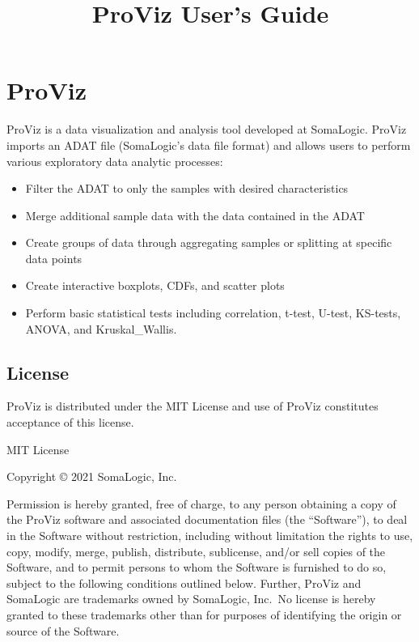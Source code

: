 \documentclass[
]{book}
\title{ProViz User's Guide}
\author{}
\date{\vspace{-2.5em}}
\providecommand{\tightlist}{%
  \setlength{\itemsep}{0pt}\setlength{\parskip}{0pt}}
\begin{document}
\maketitle

{
\setcounter{tocdepth}{1}
\tableofcontents
}
\hypertarget{proviz}{%
\chapter*{ProViz}\label{proviz}}

ProViz is a data visualization and analysis tool developed at SomaLogic. ProViz imports an ADAT file (SomaLogic's data file format) and allows users to perform various exploratory data analytic processes:

\begin{itemize}
\tightlist
\item
  Filter the ADAT to only the samples with desired characteristics
\item
  Merge additional sample data with the data contained in the ADAT
\item
  Create groups of data through aggregating samples or splitting at specific data points
\item
  Create interactive boxplots, CDFs, and scatter plots
\item
  Perform basic statistical tests including correlation, t-test, U-test, KS-tests, ANOVA, and Kruskal\_Wallis.
\end{itemize}

\hypertarget{license}{%
\section*{License}\label{license}}

ProViz is distributed under the MIT License and use of ProViz constitutes acceptance of this license.

MIT License

Copyright © 2021 SomaLogic, Inc.

Permission is hereby granted, free of charge, to any person obtaining a copy of the ProViz software and associated documentation files (the ``Software''), to deal in the Software without restriction, including without limitation the rights to use, copy, modify, merge, publish, distribute, sublicense, and/or sell copies of the Software, and to permit persons to whom the Software is furnished to do so, subject to the following conditions outlined below. Further, ProViz and SomaLogic are trademarks owned by SomaLogic, Inc.~No license is hereby granted to these trademarks other than for purposes of identifying the origin or source of the Software.
\end{document}
